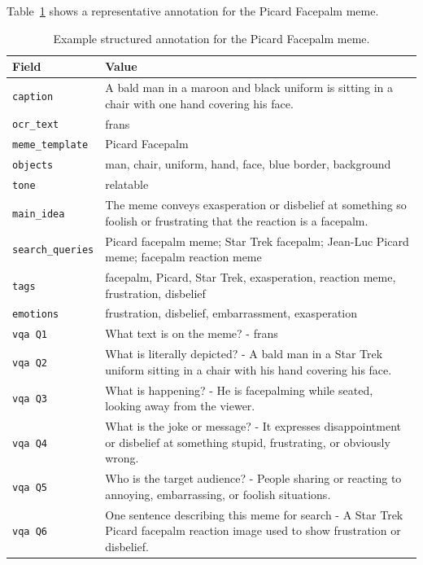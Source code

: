 \documentclass[a4paper,12pt]{article}
\begin{document}
Table~\ref{tab:annotation_example} shows a representative annotation for the Picard Facepalm meme.

\begin{table}[H]
\centering
\caption{Example structured annotation for the Picard Facepalm meme.}
\label{tab:annotation_example}
\small
\begin{tabular}{|l|p{9cm}|}
\hline
\textbf{Field} & \textbf{Value} \\
\hline
\texttt{caption} & A bald man in a maroon and black uniform is sitting in a chair with one hand covering his face. \\
\hline
\texttt{ocr\_text} & frans \\
\hline
\texttt{meme\_template} & Picard Facepalm \\
\hline
\texttt{objects} & man, chair, uniform, hand, face, blue border, background \\
\hline
\texttt{tone} & relatable \\
\hline
\texttt{main\_idea} & The meme conveys exasperation or disbelief at something so foolish or frustrating that the reaction is a facepalm. \\
\hline
\texttt{search\_queries} & Picard facepalm meme; Star Trek facepalm; Jean-Luc Picard meme; facepalm reaction meme \\
\hline
\texttt{tags} & facepalm, Picard, Star Trek, exasperation, reaction meme, frustration, disbelief \\
\hline
\texttt{emotions} & frustration, disbelief, embarrassment, exasperation \\
\hline
\texttt{vqa Q1} & What text is on the meme? - frans \\
\hline
\texttt{vqa Q2} & What is literally depicted? - A bald man in a Star Trek uniform sitting in a chair with his hand covering his face. \\
\hline
\texttt{vqa Q3} & What is happening? - He is facepalming while seated, looking away from the viewer. \\
\hline
\texttt{vqa Q4} & What is the joke or message? - It expresses disappointment or disbelief at something stupid, frustrating, or obviously wrong. \\
\hline
\texttt{vqa Q5} & Who is the target audience? - People sharing or reacting to annoying, embarrassing, or foolish situations. \\
\hline
\texttt{vqa Q6} & One sentence describing this meme for search - A Star Trek Picard facepalm reaction image used to show frustration or disbelief. \\
\hline
\end{tabular}
\end{table}
\end{document}

